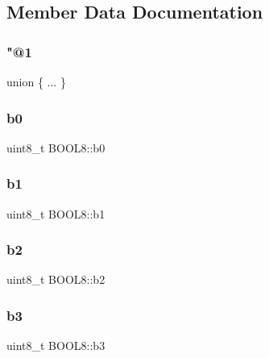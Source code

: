 \subsection{Member Data Documentation}
\hypertarget{struct_b_o_o_l8_a72813d4b64bdbbca089559daa6944a4e}{}\label{struct_b_o_o_l8_a72813d4b64bdbbca089559daa6944a4e} 
\subsubsection{\texorpdfstring{"@1}{@1}}
{\footnotesize\ttfamily union \{ ... \} }

\hypertarget{struct_b_o_o_l8_a92d3ed58a5512657583cd9926342c99e}{}\label{struct_b_o_o_l8_a92d3ed58a5512657583cd9926342c99e} 
\subsubsection{\texorpdfstring{b0}{b0}}
{\footnotesize\ttfamily uint8\+\_\+t B\+O\+O\+L8\+::b0}

\hypertarget{struct_b_o_o_l8_a699c85868039c9754d65914930ad30eb}{}\label{struct_b_o_o_l8_a699c85868039c9754d65914930ad30eb} 
\subsubsection{\texorpdfstring{b1}{b1}}
{\footnotesize\ttfamily uint8\+\_\+t B\+O\+O\+L8\+::b1}

\hypertarget{struct_b_o_o_l8_a49da127bcc938c52c198397e4288f826}{}\label{struct_b_o_o_l8_a49da127bcc938c52c198397e4288f826} 
\subsubsection{\texorpdfstring{b2}{b2}}
{\footnotesize\ttfamily uint8\+\_\+t B\+O\+O\+L8\+::b2}

\hypertarget{struct_b_o_o_l8_a74a24b53dcf41471af36714c18865e71}{}\label{struct_b_o_o_l8_a74a24b53dcf41471af36714c18865e71} 
\subsubsection{\texorpdfstring{b3}{b3}}
{\footnotesize\ttfamily uint8\+\_\+t B\+O\+O\+L8\+::b3}

